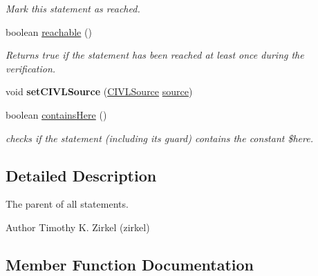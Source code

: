\begin{DoxyCompactItemize}
\begin{DoxyCompactList}\small\item\em Mark this statement as reached. \end{DoxyCompactList}\item 
boolean \hyperlink{interfaceedu_1_1udel_1_1cis_1_1vsl_1_1civl_1_1model_1_1IF_1_1statement_1_1Statement_a8d994da12afc904464f92ca73ac9f682}{reachable} ()
\begin{DoxyCompactList}\small\item\em Returns true if the statement has been reached at least once during the verification. \end{DoxyCompactList}\item 
\hypertarget{interfaceedu_1_1udel_1_1cis_1_1vsl_1_1civl_1_1model_1_1IF_1_1statement_1_1Statement_a52298e0fa5a8d8f9e9aa95ec425ee951}{}void {\bfseries set\+C\+I\+V\+L\+Source} (\hyperlink{interfaceedu_1_1udel_1_1cis_1_1vsl_1_1civl_1_1model_1_1IF_1_1CIVLSource}{C\+I\+V\+L\+Source} \hyperlink{interfaceedu_1_1udel_1_1cis_1_1vsl_1_1civl_1_1model_1_1IF_1_1statement_1_1Statement_ad84bcec9f2c570e8e22c23583653469b}{source})\label{interfaceedu_1_1udel_1_1cis_1_1vsl_1_1civl_1_1model_1_1IF_1_1statement_1_1Statement_a52298e0fa5a8d8f9e9aa95ec425ee951}

\item 
boolean \hyperlink{interfaceedu_1_1udel_1_1cis_1_1vsl_1_1civl_1_1model_1_1IF_1_1statement_1_1Statement_ac2af8fe99442e5174b1a13c786981a4d}{contains\+Here} ()
\begin{DoxyCompactList}\small\item\em checks if the statement (including its guard) contains the constant \$here. \end{DoxyCompactList}\end{DoxyCompactItemize}


\subsection{Detailed Description}
The parent of all statements. 

\begin{DoxyAuthor}{Author}
Timothy K. Zirkel (zirkel) 
\end{DoxyAuthor}


\subsection{Member Function Documentation}
\hypertarget{interfaceedu_1_1udel_1_1cis_1_1vsl_1_1civl_1_1model_1_1IF_1_1statement_1_1Statement_ac2af8fe99442e5174b1a13c786981a4d}{}
